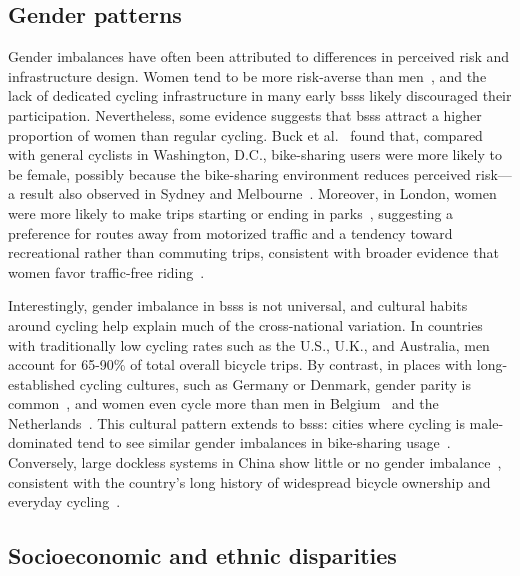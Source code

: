     \subsection{Gender patterns}

    Gender imbalances have often been attributed to differences in perceived risk and infrastructure design. Women tend to be more risk-averse than men~\cite{Garrard2008, Garrard2012}, and the lack of dedicated cycling infrastructure in many early \acp{bss} likely discouraged their participation. Nevertheless, some evidence suggests that \acp{bss} attract a higher proportion of women than regular cycling. Buck et al.~\cite{Buck2013} found that, compared with general cyclists in Washington, D.C., bike-sharing  users were more likely to be female, possibly because the bike-sharing environment reduces perceived risk—a result also observed in Sydney and Melbourne~\cite{Pucher2011}. Moreover, in London, women were more likely to make trips starting or ending in parks~\cite{Goodman2014}, suggesting a preference for routes away from motorized traffic and a tendency toward recreational rather than commuting trips, consistent with broader evidence that women favor traffic-free riding~\cite{Johnson2010}.

    Interestingly, gender imbalance in \acp{bss} is not universal, and cultural habits around cycling help explain much of the cross-national variation. In countries with traditionally low cycling rates such as the U.S., U.K., and Australia, men account for 65-90\% of total overall bicycle trips. By contrast, in places with long-established cycling cultures, such as Germany or Denmark, gender parity is common~\cite{Pucher2008}, and women even cycle more than men in Belgium~\cite{Witlox2004} and the Netherlands~\cite{Harms2014}. This cultural pattern extends to \acp{bss}: cities where cycling is male-dominated tend to see similar gender imbalances in bike-sharing usage~\cite{Fishman2016, Willberg2021}. Conversely, large dockless systems in China show little or no gender imbalance~\cite{Chen2020_exploring}, consistent with the country’s long history of widespread bicycle ownership and everyday cycling~\cite{Zhang2015}.

    \subsection{Socioeconomic and ethnic disparities}

